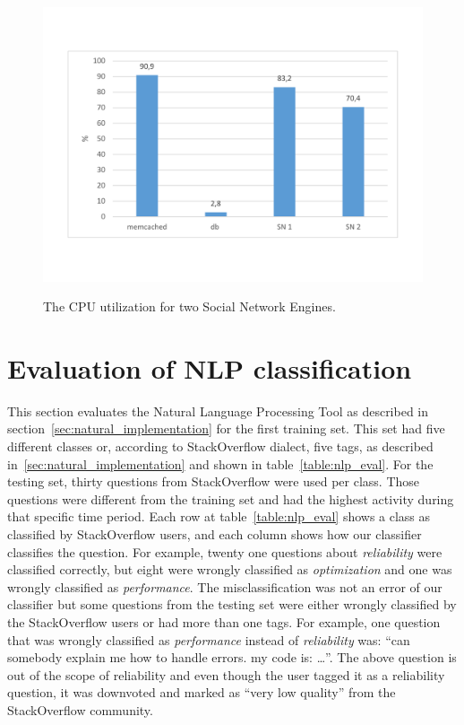 \begin{figure}[h]
	\caption{The CPU utilization for two Social Network Engines.}
	\includegraphics[width=1\textwidth,natwidth=200,natheight=150]{./fig/Usage2SN.pdf}
	\centering
	\label{fig:cpu2SNavg}
\end{figure}

\section{Evaluation of NLP classification}
\label{sec:nlp_evaluation}
This section evaluates the Natural Language Processing Tool as described in section~\ref{sec:natural_implementation} for the first training set. This set had five different classes or, according to StackOverflow dialect, five tags, as described in~\ref{sec:natural_implementation} and shown in table~\ref{table:nlp_eval}. For the testing set, thirty questions from StackOverflow were used per class. Those questions were different from the training set and had the highest activity during that specific time period. Each row at table~\ref{table:nlp_eval} shows a class as classified by StackOverflow users, and each column shows how our classifier classifies the question. For example, twenty one questions about \emph{reliability} were classified correctly, but eight were wrongly classified as \emph{optimization} and one was wrongly classified as \emph{performance}. The misclassification was not an error of our classifier but some questions from the testing set were either wrongly classified by the StackOverflow users or had more than one tags. For example, one question that was wrongly classified as \emph{performance} instead of \emph{reliability} was: ``can somebody explain me how to handle errors. my code is: \ldots''. The above question is out of the scope of reliability and even though the user tagged it as a reliability question, it was downvoted and marked as ``very low quality'' from the StackOverflow community.

